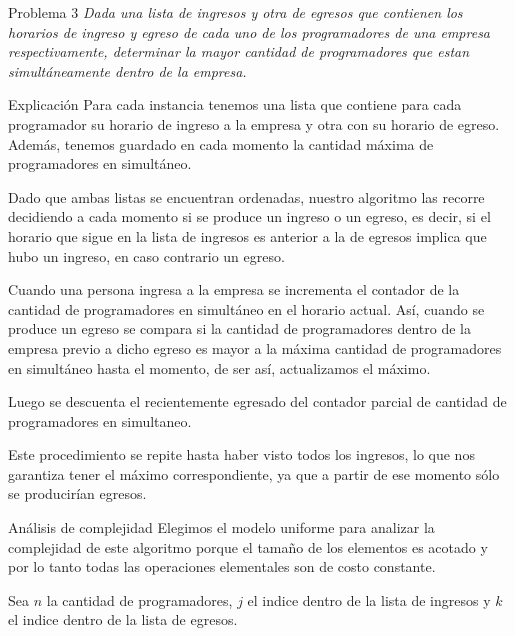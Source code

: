 \begin{section}{Problema 3}
	\textit{Dada una lista de ingresos y otra de egresos que contienen los horarios de ingreso y egreso de cada uno de los programadores de una empresa respectivamente, determinar la mayor cantidad de programadores que estan simultáneamente dentro de la empresa.}
	\begin{subsection}{Explicación}
		Para cada instancia tenemos una lista que contiene para cada programador su horario de ingreso a la empresa y otra con su horario de egreso. Además, tenemos guardado en cada momento la cantidad máxima de programadores en simultáneo.

Dado que ambas listas se encuentran ordenadas, nuestro algoritmo las recorre decidiendo a cada momento si se produce un ingreso o un egreso, es decir, si el horario que sigue en la lista de ingresos es anterior a la de egresos implica que hubo un ingreso, en caso contrario un egreso.

Cuando una persona ingresa a la empresa se incrementa el contador de la cantidad de programadores en simultáneo en el horario actual. Así, cuando se produce un egreso se compara si la cantidad de programadores dentro de la empresa previo a dicho egreso es mayor a la máxima cantidad de programadores en simultáneo hasta el momento, de ser así, actualizamos el máximo.

Luego se descuenta el recientemente egresado del contador parcial de cantidad de programadores en simultaneo.

Este procedimiento se repite hasta haber visto todos los ingresos, lo que nos garantiza tener el máximo correspondiente, ya que a partir de ese momento sólo se producirían egresos.

		\begin{subsubsection}{Análisis de complejidad}
			Elegimos el modelo uniforme para analizar la complejidad de este algoritmo porque el tamaño de los elementos es acotado y por lo tanto todas las operaciones elementales son de costo constante.\Pa
			
			Sea $n$ la cantidad de programadores, $j$ el indice dentro de la lista de ingresos y $k$ el indice dentro de la lista de egresos.\\
			

\end{subsubsection}
\end{subsection}
\end{section}
